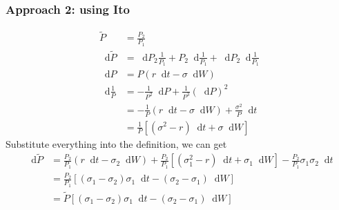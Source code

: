\documentclass[12pt]{article}
\newcommand{\dd}{\mathop{}\!\text{d}}
\begin{document}
\begin{appendices}
\subsubsection*{Approach 2: using Ito}
\begin{align}
    \tilde{P} &= \frac{P_2}{P_1} \\
    \dd \tilde{P}  &= \dd P_2 \frac{1}{P_1} + P_2 \dd \frac{1}{P_1} + \dd P_2 \dd \frac{1}{P_1} \\
    \dd P &= P (r \dd t - \sigma \dd W) \\
    \nonumber
    \dd \frac{1}{P} &= - \frac{1}{P^2} \dd P + \frac{1}{P^3} (\dd P)^2 \\
        \nonumber
        &= -\frac{1}{P} (r \dd t - \sigma \dd W) + \frac{\sigma^2}{P} \dd t\\ 
        &= \frac{1}{P} \left[
            (\sigma^2 - r) \dd t + \sigma \dd W
        \right]
\end{align}
Substitute everything into the definition, we can get 
\begin{align}
    \nonumber
    \dd \tilde{P} &= \frac{P_2}{P_1}(r \dd t - \sigma_2 \dd W) +
        \frac{P_2}{P_1} \left[
            (\sigma_1^2 - r ) \dd t + \sigma_1\dd W
        \right] - \frac{P_2}{P_1} \sigma_1 \sigma_2 \dd t \\
        \nonumber
        &= \frac{P_2}{P_1} \left[
            (\sigma_1 - \sigma_2) \sigma_1 \dd t - (\sigma_2 - \sigma_1) \dd W
        \right] \\
        &= \tilde{P} \left[
            (\sigma_1 - \sigma_2) \sigma_1 \dd t - (\sigma_2 - \sigma_1) \dd W
        \right]
\end{align}

\label{sec:vasicek_bond_price_derivation}

\end{appendices}
\end{document}
